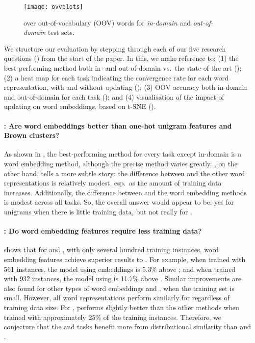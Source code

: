 \begin{figure}[t!]
\centering
    	\texttt{[image: ovvplots]}
\caption{\accuracy over out-of-vocabulary (OOV) words for \textit{in-domain} and \textit{out-of-domain} test sets.}
\label{OOV} 
\end{figure}



We structure our evaluation by stepping through each of our five
research questions (\RQ[1--5]) from the start of the paper. In this, we
make reference to: (1) the best-performing method both in- and
out-of-domain vs.\ the state-of-the-art (); (2) a
heat map for each task indicating the convergence rate for each word
representation, with and without updating (); 
(3) OOV accuracy both in-domain and out-of-domain for each task
(); and (4)  visualisation of the impact of
updating on word embeddings, based on t-SNE
().

\paragraph{\RQ[1]: Are word embeddings better than one-hot unigram features
  and Brown clusters?}  As shown in , the
best-performing method for every task except in-domain \chunking is a
word embedding method, although the precise method varies
greatly. , on the other hand, tells a more subtle
story: the difference between \unigram and the other word
representations is relatively modest, esp.\ as the amount of training
data increases. Additionally, the difference between \brown and the word
embedding methods is modest across all tasks. So, the overall answer
would appear to be: yes for unigrams when there is little training data, but not really for \brown.




\paragraph{\RQ[2]: Do word embedding features require less training data?}
 shows that for \pos and \ner, with only several hundred training instances, 
word embedding features achieve superior results to \unigram. 
For example, when trained with 561 instances, the \pos model using \Skipgram[\withup] embeddings is 5.3\% above
\unigram; and when trained with 932 instances, the \ner model using \Skipgram is 11.7\% above \unigram. 
Similar improvements are also found for other types of word embeddings and \brown, when the training set is small. 
However, all word representations perform similarly for \chunking
regardless of training data size.
For \mwe, \brown performs slightly better than the other methods when
trained with approximately 25\% of the training instances. 
Therefore, we conjecture that the \pos and \ner tasks benefit more from
distributional similarity than \chunking and \mwe.

